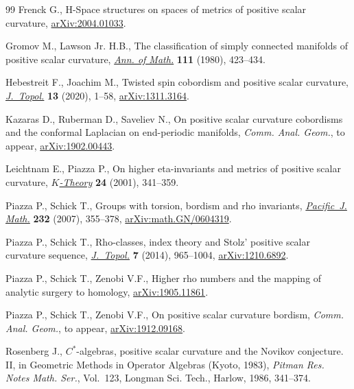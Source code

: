 \documentclass[10pt,a4paper]{amsart}
\numberwithin{equation}{section}
\begin{document}
\begin{thebibliography}{99}
Frenck G., H-Space structures on spaces of metrics of positive scalar
 curvature, \href{https://arxiv.org/abs/2004.01033}{arXiv:2004.01033}.

Gromov M., Lawson Jr. H.B., The classification of simply connected manifolds of
 positive scalar curvature, \href{https://doi.org/10.2307/1971103}{\textit{Ann. of Math.}} \textbf{111} (1980),
 423--434.

Hebestreit F., Joachim M., Twisted spin cobordism and positive scalar
 curvature, \href{https://doi.org/10.1112/topo.12122}{\textit{J.~Topol.}} \textbf{13} (2020), 1--58, \href{https://arxiv.org/abs/1311.3164}{arXiv:1311.3164}.

Kazaras D., Ruberman D., Saveliev N., On positive scalar curvature cobordisms
 and the conformal {L}aplacian on end-periodic manifolds, \textit{Comm. Anal.
 Geom.}, {t}o appear, \href{https://arxiv.org/abs/1902.00443}{arXiv:1902.00443}.

Leichtnam E., Piazza P., On higher eta-invariants and metrics of positive
 scalar curvature, \href{https://doi.org/10.1023/A:1014079307698}{\textit{$K$-Theory}} \textbf{24} (2001), 341--359.

Piazza P., Schick T., Groups with torsion, bordism and rho invariants,
 \href{https://doi.org/10.2140/pjm.2007.232.355}{\textit{Pacific~J. Math.}} \textbf{232} (2007), 355--378,
 \href{https://arxiv.org/abs/math.GN/0604319}{arXiv:math.GN/0604319}.

Piazza P., Schick T., Rho-classes, index theory and {S}tolz' positive scalar
 curvature sequence, \href{https://doi.org/10.1112/jtopol/jtt048}{\textit{J.~Topol.}} \textbf{7} (2014), 965--1004,
 \href{https://arxiv.org/abs/1210.6892}{arXiv:1210.6892}.

Piazza P., Schick T., Zenobi V.F., Higher rho numbers and the mapping of
 analytic surgery to homology, \href{https://arxiv.org/abs/1905.11861}{arXiv:1905.11861}.

Piazza P., Schick T., Zenobi V.F., On positive scalar curvature bordism,
 \textit{Comm. Anal. Geom.}, {t}o appear, \href{https://arxiv.org/abs/1912.09168}{arXiv:1912.09168}.

Rosenberg J., {$C^\ast$}-algebras, positive scalar curvature and the {N}ovikov
 conjecture. {II}, in Geometric Methods in Operator Algebras ({K}yoto, 1983),
 \textit{Pitman Res. Notes Math. Ser.}, Vol.~123, Longman Sci. Tech., Harlow,
 1986, 341--374.


\end{thebibliography}
\end{document}
